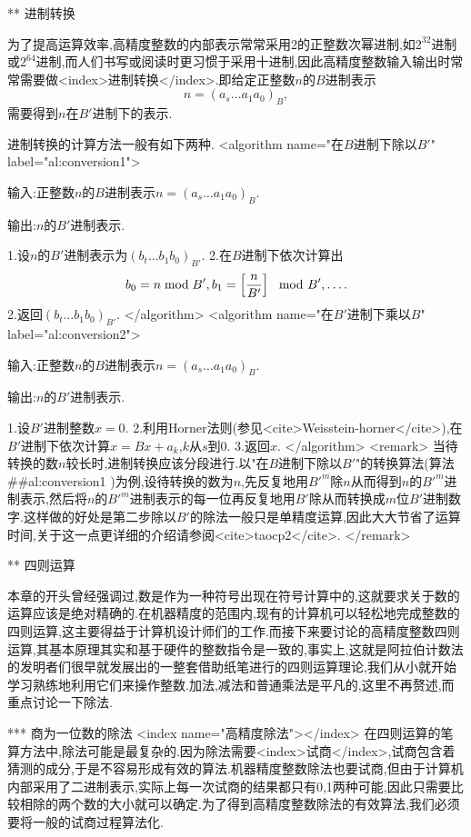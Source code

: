 ** 进制转换

为了提高运算效率,高精度整数的内部表示常常采用2的正整数次幂进制,如$2^{32}$进制或$2^{64}$进制,而人们书写或阅读时更习惯于采用十进制,因此高精度整数输入输出时常常需要做<index>进制转换</index>.即给定正整数$n$的$B$进制表示$$n=(a_s\ldots a_1a_0)_B,$$需要得到$n$在$B'$进制下的表示.

进制转换的计算方法一般有如下两种.
<algorithm  name="在$B$进制下除以$B'$" label="al:conversion1">

输入:正整数$n$的$B$进制表示$n=(a_s\ldots a_1a_0)_B$.

输出:$n$的$B'$进制表示.

 1.设$n$的$B'$进制表示为$(b_t \ldots b_1b_0)_{B'}$.
 2.在$B$进制下依次计算出$$b_0=n\bmod B',b_1=\left[{n\over B'}\right]\mod B',\ldots.$$
 2.返回$(b_t\ldots b_1b_0)_{B'}$.
</algorithm>
<algorithm name="在$B'$进制下乘以$B$" label="al:conversion2">

输入:正整数$n$的$B$进制表示$n=(a_s\ldots a_1a_0)_B$.

输出:$n$的$B'$进制表示.

 1.设$B'$进制整数$x=0$.
 2.利用Horner法则(参见<cite>Weisstein-horner</cite>),在$B'$进制下依次计算$x=Bx+a_k$,$k$从$s$到0.
 3.返回$x$.
</algorithm>
<remark>
当待转换的数$n$较长时,进制转换应该分段进行.以"在$B$进制下除以$B'$"的转换算法(算法##al:conversion1
)为例,设待转换的数为$n$,先反复地用$B'^m$除$n$从而得到$n$的$B'^m$进制表示,然后将$n$的$B'^m$进制表示的每一位再反复地用$B'$除从而转换成$m$位$B'$进制数字.这样做的好处是第二步除以$B'$的除法一般只是单精度运算,因此大大节省了运算时间,关于这一点更详细的介绍请参阅<cite>taocp2</cite>.
</remark>

** 四则运算

本章的开头曾经强调过,数是作为一种符号出现在符号计算中的,这就要求关于数的运算应该是绝对精确的.在机器精度的范围内,现有的计算机可以轻松地完成整数的四则运算,这主要得益于计算机设计师们的工作.而接下来要讨论的高精度整数四则运算,其基本原理其实和基于硬件的整数指令是一致的,事实上,这就是阿拉伯计数法的发明者们很早就发展出的一整套借助纸笔进行的四则运算理论,我们从小就开始学习熟练地利用它们来操作整数.加法,减法和普通乘法是平凡的,这里不再赘述,而重点讨论一下除法.

*** 商为一位数的除法
<index name="高精度除法"></index>
在四则运算的笔算方法中,除法可能是最复杂的.因为除法需要<index>试商</index>,试商包含着猜测的成分,于是不容易形成有效的算法.机器精度整数除法也要试商,但由于计算机内部采用了二进制表示,实际上每一次试商的结果都只有0,1两种可能,因此只需要比较相除的两个数的大小就可以确定.为了得到高精度整数除法的有效算法,我们必须要将一般的试商过程算法化.

